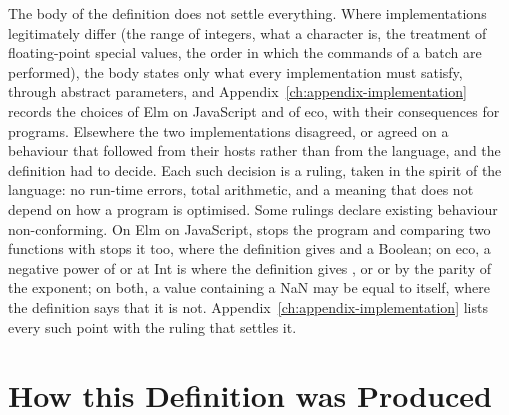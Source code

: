 The body of the definition does not settle everything. Where implementations
legitimately differ (the range of integers, what a character is, the
treatment of floating-point special values, the order in which the commands
of a batch are performed), the body states only what every implementation
must satisfy, through abstract parameters, and
Appendix~\ref{ch:appendix-implementation} records the choices of Elm on
JavaScript and of eco, with their consequences for programs. %
Elsewhere the two implementations disagreed, or agreed on a behaviour that
followed from their hosts rather than from the language, and the definition
had to decide. Each such decision is a ruling, taken in the spirit of the
language: no run-time errors, total arithmetic, and a meaning that does not
depend on how a program is optimised. Some rulings declare existing
behaviour non-conforming. On Elm on JavaScript,  stops the
program and comparing two functions with \kw{==} stops it too, where the
definition gives  and a Boolean; on eco, a negative power of
 or  at Int is  where the definition gives , or
 or  by the parity of the exponent;
on both, a value containing a NaN may be equal to itself, where the
definition says that it is not. %
Appendix~\ref{ch:appendix-implementation} lists every such point with the
ruling that settles it.

\section*{How this Definition was Produced}

